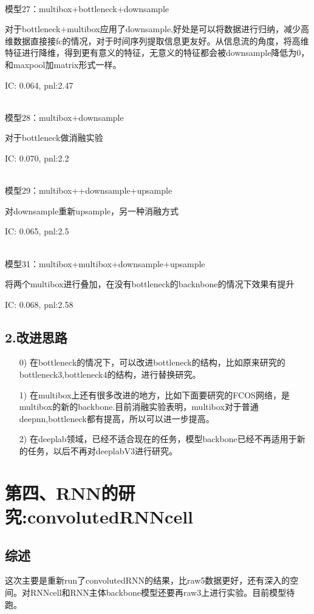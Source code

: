 \documentclass[11pt]{ctexart}
\begin{document}
~\\

模型27：multibox+bottleneck+downsample

对于bottleneck+multibox应用了downsample,好处是可以将数据进行归纳，减少高维数据直接接fc的情况，对于时间序列提取信息更友好。从信息流的角度，将高维特征进行降维，得到更有意义的特征，无意义的特征都会被downsample降低为0，和maxpool加matrix形式一样。

{\kaishu \small IC: 0.064, pnl:2.47}


~\\
模型28：multibox+downsample

对于bottleneck做消融实验

{\kaishu \small IC: 0.070, pnl:2.2}


~\\
模型29：multibox++downsample+upsample

对downsample重新upsample，另一种消融方式

{\kaishu \small IC: 0.065, pnl:2.5}


~\\
模型31：multibox+multibox+downsample+upsample

将两个multibox进行叠加，在没有bottleneck的backnbone的情况下效果有提升

{\kaishu \small IC: 0.068, pnl:2.58}


\subsection{2.改进思路}
\begin{itemize}
  \item [0)]
  在bottleneck的情况下，可以改进bottleneck的结构，比如原来研究的bottleneck3,bottleneck4的结构，进行替换研究。
  \item [1)]
  在multibox上还有很多改进的地方，比如下面要研究的FCOS网络，是multibox的新的backbone.目前消融实验表明，multibox对于普通deepnn,bottleneck都有提高，所以可以进一步提高。
  \item [2)]
  在deeplab领域，已经不适合现在的任务，模型backbone已经不再适用于新的任务，以后不再对deeplabV3进行研究。
\end{itemize}


\section{第四、RNN的研究:convolutedRNNcell}
\subsection{综述}
这次主要是重新run了convolutedRNN的结果，比raw5数据更好，还有深入的空间。对RNNcell和RNN主体backbone模型还要再raw3上进行实验。目前模型待跑。
\end{document}
